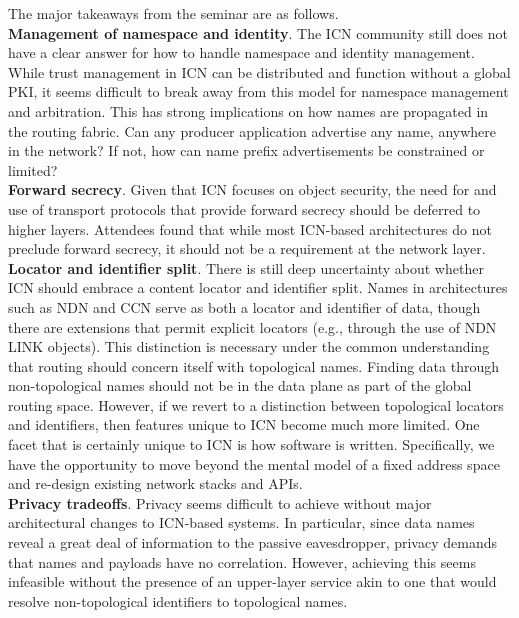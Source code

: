 \documentclass{sig-alternate-10pt}
\makeatletter
\renewcommand{\paragraph}[1]{\vspace*{0.03in}\noindent{\bf #1.}\hspace{0.25ex \@plus1ex \@minus.2ex}}
\makeatother
\begin{document}
\paragraph{Main Takeways} The major takeaways from the seminar are as follows. \\

\noindent
{\bf Management of namespace and identity}. The ICN community still does not have a clear answer for how to handle
namespace and identity management. While trust management in ICN can be distributed and
function without a global PKI, it seems difficult to break away from this model for
namespace management and arbitration. This has strong implications on how names are
propagated in the routing fabric. Can any producer application advertise any name,
anywhere in the network? If not, how can name prefix advertisements be constrained or limited? \\

\noindent
{\bf Forward secrecy}. Given that ICN focuses on object security, the need for and use of transport
protocols that provide forward secrecy should be deferred to higher layers. Attendees
found that while most ICN-based architectures do not preclude forward secrecy, it should
not be a requirement at the network layer.\\

\noindent
{\bf Locator and identifier split}. There is still deep uncertainty about whether ICN should embrace a content
locator and identifier split. Names in architectures such as NDN and CCN serve as both a
locator and identifier of data, though there are extensions that permit explicit locators
(e.g., through the use of NDN LINK objects). This distinction is necessary under the
common understanding that routing should concern itself with topological names. Finding
data through non-topological names should not be in the data plane as part of the global
routing space. However, if we revert to a distinction between topological locators and
identifiers, then features unique to ICN become much more limited. One facet that is
certainly unique to ICN is how software is written. Specifically, we have the opportunity
to move beyond the mental model of a fixed address space and re-design existing network
stacks and APIs.\\

\noindent
{\bf Privacy tradeoffs}. Privacy seems difficult to achieve without major architectural changes to
ICN-based systems. In particular, since data names reveal a great deal of information to
the passive eavesdropper, privacy demands that names and payloads have no correlation.
However, achieving this seems infeasible without the presence of an upper-layer service
akin to one that would resolve non-topological identifiers to topological names.\\
\end{document}

